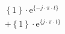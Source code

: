 \correct
\[
\begin{split}
&  \left \{ 1 \right \} \cdot \textrm{e}^{\{- j \cdot \pi \cdot t \}}\\
&+ \left \{ 1 \right \} \cdot \textrm{e}^{\{  j \cdot \pi \cdot t \}}
\end{split}
\]
